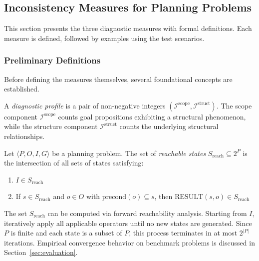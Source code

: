 \subsection{Inconsistency Measures for Planning Problems}
\label{sec:proposed_measures}

This section presents the three diagnostic measures with formal definitions. Each measure is defined, followed by examples using the test scenarios.

\subsubsection{Preliminary Definitions}

Before defining the measures themselves, several foundational concepts are established.

\begin{defn}
    \label{defn:diagnostic_profile}
    A \emph{diagnostic profile} is a pair of non-negative integers $(\mathcal{I}^{\text{scope}}, \mathcal{I}^{\text{struct}})$. The scope component $\mathcal{I}^{\text{scope}}$ counts goal propositions exhibiting a structural phenomenon, while the structure component $\mathcal{I}^{\text{struct}}$ counts the underlying structural relationships.
\end{defn}

\begin{defn}
    \label{defn:reachable_states}
    Let $\langle P, O, I, G \rangle$ be a planning problem. The set of \emph{reachable states} $S_{\text{reach}} \subseteq 2^P$ is the intersection of all sets of states satisfying:
    \begin{enumerate}
        \item $I \in S_{\text{reach}}$
        \item If $s \in S_{\text{reach}}$ and $o \in O$ with $\text{precond}(o) \subseteq s$, then $\text{RESULT}(s,o) \in S_{\text{reach}}$
    \end{enumerate}
\end{defn}

The set $S_{\text{reach}}$ can be computed via forward reachability analysis. Starting from $I$, iteratively apply all applicable operators until no new states are generated. Since $P$ is finite and each state is a subset of $P$, this process terminates in at most $2^{|P|}$ iterations. Empirical convergence behavior on benchmark problems is discussed in Section~\ref{sec:evaluation}.

